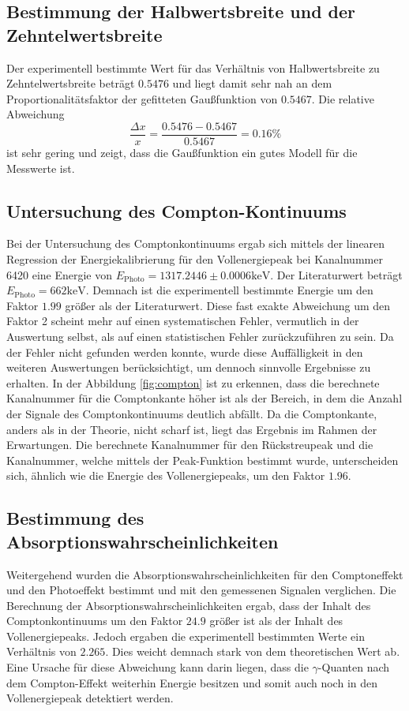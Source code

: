 \subsection{Bestimmung der Halbwertsbreite und der Zehntelwertsbreite}
Der experimentell bestimmte Wert für das Verhältnis von Halbwertsbreite zu Zehntelwertsbreite beträgt $0.5476$ und 
liegt damit sehr nah an dem Proportionalitätsfaktor der gefitteten Gaußfunktion von $0.5467$.
Die relative Abweichung 
\begin{equation}
  \frac{\Delta x}{x} = \frac{0.5476 - 0.5467}{0.5467} = 0.16 \si{\percent}
\end{equation}
ist sehr gering und zeigt, dass die Gaußfunktion ein gutes Modell für die Messwerte ist.

\subsection{Untersuchung des Compton-Kontinuums}
Bei der Untersuchung des Comptonkontinuums ergab sich mittels der linearen Regression der Energiekalibrierung
für den Vollenergiepeak bei Kanalnummer 6420 eine Energie von $E_\text{Photo}=1317.2446\pm 0.0006 \si{\kilo\electronvolt}$.
Der Literaturwert beträgt $E_\text{Photo}=662 \si{\kilo\electronvolt}$.
Demnach ist die experimentell bestimmte Energie um den Faktor $1.99$ größer als der Literaturwert.
Diese fast exakte Abweichung um den Faktor 2 scheint mehr auf einen systematischen Fehler, vermutlich in der Auswertung selbst, 
als auf einen statistischen Fehler zurückzuführen zu sein.
Da der Fehler nicht gefunden werden konnte, 
wurde diese Auffälligkeit in den weiteren Auswertungen berücksichtigt, 
um dennoch sinnvolle Ergebnisse zu erhalten.
In der Abbildung \ref{fig:compton} ist zu erkennen,
dass die berechnete Kanalnummer für die Comptonkante höher ist als der Bereich, 
in dem die Anzahl der Signale des Comptonkontinuums deutlich abfällt.
Da die Comptonkante, anders als in der Theorie, nicht scharf ist, liegt das Ergebnis im Rahmen der Erwartungen.
Die berechnete Kanalnummer für den Rückstreupeak und die Kanalnummer, welche mittels der Peak-Funktion bestimmt wurde,
unterscheiden sich, ähnlich wie die Energie des Vollenergiepeaks, um den Faktor $1.96$.

\subsection{Bestimmung des Absorptionswahrscheinlichkeiten}
Weitergehend wurden die Absorptionswahrscheinlichkeiten für den Comptoneffekt und den Photoeffekt bestimmt
und mit den gemessenen Signalen verglichen.
Die Berechnung der Absorptionswahrscheinlichkeiten ergab, dass der Inhalt des Comptonkontinuums um den Faktor $24.9$ größer ist als der Inhalt des Vollenergiepeaks.
Jedoch ergaben die experimentell bestimmten Werte ein Verhältnis von $2.265$.
Dies weicht demnach stark von dem theoretischen Wert ab.
Eine Ursache für diese Abweichung kann darin liegen,
dass die $\gamma$-Quanten nach dem Compton-Effekt weiterhin Energie besitzen und somit auch noch in den Vollenergiepeak detektiert werden.

